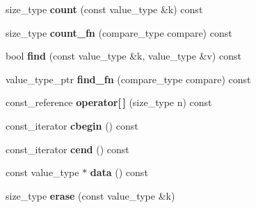 \begin{DoxyCompactItemize}
\item 
\hypertarget{classrs_1_1_lazy_flat_set_a453db2cb99f2a2460587357d6172f53d}{size\+\_\+type {\bfseries count} (const value\+\_\+type \&k) const }\label{classrs_1_1_lazy_flat_set_a453db2cb99f2a2460587357d6172f53d}

\item 
\hypertarget{classrs_1_1_lazy_flat_set_a858b3de5ef175c352b0de597605a4651}{size\+\_\+type {\bfseries count\+\_\+fn} (compare\+\_\+type compare) const }\label{classrs_1_1_lazy_flat_set_a858b3de5ef175c352b0de597605a4651}

\item 
\hypertarget{classrs_1_1_lazy_flat_set_aaaac3c19a0d0ae902fa46528ca0e1951}{bool {\bfseries find} (const value\+\_\+type \&k, value\+\_\+type \&v) const }\label{classrs_1_1_lazy_flat_set_aaaac3c19a0d0ae902fa46528ca0e1951}

\item 
\hypertarget{classrs_1_1_lazy_flat_set_a2f67bfa2c404bb3ce9723e5760b9174e}{value\+\_\+type\+\_\+ptr {\bfseries find\+\_\+fn} (compare\+\_\+type compare) const }\label{classrs_1_1_lazy_flat_set_a2f67bfa2c404bb3ce9723e5760b9174e}

\item 
\hypertarget{classrs_1_1_lazy_flat_set_a89b957974d573d58f76a893a793f6a2f}{const\+\_\+reference {\bfseries operator\mbox{[}$\,$\mbox{]}} (size\+\_\+type n) const }\label{classrs_1_1_lazy_flat_set_a89b957974d573d58f76a893a793f6a2f}

\item 
\hypertarget{classrs_1_1_lazy_flat_set_a7682d5040699a6e5780a50803b692f40}{const\+\_\+iterator {\bfseries cbegin} () const }\label{classrs_1_1_lazy_flat_set_a7682d5040699a6e5780a50803b692f40}

\item 
\hypertarget{classrs_1_1_lazy_flat_set_a7a405e2401d17db44397bced6584fabb}{const\+\_\+iterator {\bfseries cend} () const }\label{classrs_1_1_lazy_flat_set_a7a405e2401d17db44397bced6584fabb}

\item 
\hypertarget{classrs_1_1_lazy_flat_set_ab9eed6a6e5f47a3f06f1b5ad21628043}{const value\+\_\+type $\ast$ {\bfseries data} () const }\label{classrs_1_1_lazy_flat_set_ab9eed6a6e5f47a3f06f1b5ad21628043}

\item 
\hypertarget{classrs_1_1_lazy_flat_set_a7cb8ec3c50be5045260bcb9dc631f146}{size\+\_\+type {\bfseries erase} (const value\+\_\+type \&k)}\label{classrs_1_1_lazy_flat_set_a7cb8ec3c50be5045260bcb9dc631f146}


\end{DoxyCompactItemize}
